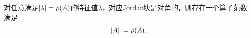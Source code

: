 \begin{remark}
    对任意满足$\lvert\lambda\rvert = \rho(A)$的特征值$\lambda$，对应Jordan块是对角的，则存在一个算子范数满足
    \begin{equation}\label{eq:na-spectral-radius-attainment}
        \lVert A\rVert = \rho(A).
    \end{equation}
\end{remark}

\iffalse

\paragraph{扰动定理}

奇异矩阵在全体矩阵中的占比极低，\footnote{因为多了一个$\det(A)=0$的限制条件。}矩阵范数可以用来衡量矩阵距离奇异矩阵的距离。

\begin{theorem}
    {扰动定理}{perturbation theorem I}
    给定扰动$B$，若$\norm B<1$，则$I+B$可逆且
    \begin{equation}
        \norm{(I+B)\inv}\leq\frac1{1-\norm B}.
    \end{equation}
\end{theorem}

\begin{proof}
    若$I+B$不可逆，即$\exists x\neq 0$使得$(I+B)x=0$，则$\rho(B)\geq 1>\norm B$矛盾。
    记$D:=(I+B)\inv$，则
    \[
        (I+B)D=I\iff D=I-BD\implies \norm D\leq 1+\norm B\norm D.
        \qedhere
    \]
\end{proof}

\begin{theorem}
    {扰动定理·二}{perturbation theorem II}
    给定$A,C$，若$A$非奇异且
    \[
        \norm{C-A}\leq\norm{A\inv}\inv,
    \]
    则$C$也非奇异，且
    \begin{equation}
        \norm{C\inv}\leq\frac{1}{\norm{A\inv}\inv-\norm{C-A}}.
    \end{equation}
\end{theorem}

\begin{proof}
    令$B=I-A\inv C$即可。
\end{proof}

\fi

